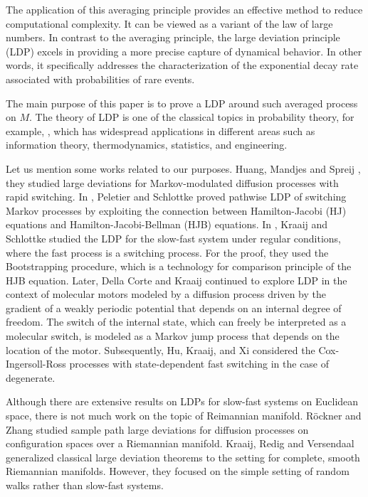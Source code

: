 \documentclass[a4paper]{article}
\numberwithin{equation}{section}
\theoremstyle{definition}
\begin{document}
The application of this averaging principle provides an effective method to reduce computational complexity. It can be viewed as a variant of the law of large numbers.
In contrast to the averaging principle, the large deviation principle (LDP) excels in providing a more precise capture of dynamical behavior. In other words, it specifically addresses the characterization of the exponential decay rate associated with probabilities of rare events.
\par
The main purpose of this paper is to prove a LDP around such averaged process on $M$. The theory of LDP is one of the classical topics in probability theory, for example, \cite{DZ1998,DH2008,FK2006}, which has widespread applications in different areas such as information theory, thermodynamics, statistics, and engineering.
\par
Let us mention some works related to our purposes. Huang, Mandjes and Spreij
\cite{HM2016}, they studied large deviations for Markov-modulated diffusion processes with rapid switching. 
In \cite{PS2021}, Peletier and Schlottke proved pathwise LDP of switching Markov processes by exploiting the connection between Hamilton-Jacobi (HJ) equations and Hamilton-Jacobi-Bellman (HJB) equations.
In \cite{KS2020}, Kraaij and Schlottke studied the LDP for the slow-fast system under regular conditions, where the fast process is a switching process. For the proof, they used the Bootstrapping procedure, which is a technology for comparison principle of the HJB equation. Later, Della Corte and Kraaij \cite{CK2024} continued to explore LDP in the context of molecular motors modeled by a diffusion process driven by the gradient of a weakly periodic potential that depends on an internal degree of freedom. The switch of the internal state, which can freely be interpreted as a molecular switch, is modeled as a Markov jump process that depends on the location of the motor. Subsequently, Hu, Kraaij, and Xi \cite{HKX2023} considered the  Cox-Ingersoll-Ross processes  with state-dependent fast switching in the case of degenerate.
\par
Although there are extensive results on LDPs for slow-fast systems on Euclidean space, there is not much work on the topic of Reimannian manifold. 
R\"{o}ckner and Zhang \cite{RZ2004} studied sample path large deviations for diffusion processes on configuration spaces over a Riemannian manifold. Kraaij, Redig and Versendaal \cite{KRV2019} generalized classical large deviation theorems to the setting for complete, smooth Riemannian manifolds. However, they focused on the simple setting of random walks rather than slow-fast systems. 
\end{document}

